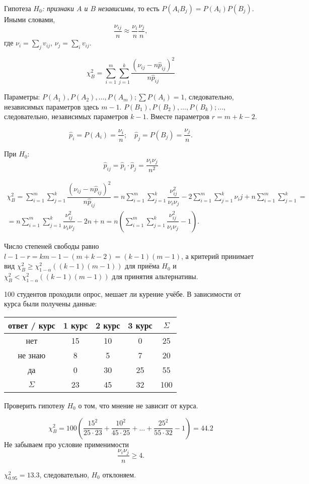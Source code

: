 Гипотеза \emph{$H_0$: признаки $A$ и $B$ независимы}, то есть
$P(A_i B_j) = P(A_i) P(B_j)$.
Иными словами,
\[
  \dfrac{\nu_{ij}}{n} \approx \dfrac{\nu_i}{n} \dfrac{\nu_j}{n},
\]
где $\nu_i = \sum_j v_{ij}$, $\nu_j = \sum_i v_{ij}$.

\[
  \chi^2_B = \sum_{i=1}^m \sum_{j=1}^k \dfrac{(\nu_{ij} - n \hat p_{ij})^2}{n \hat p_{ij}}
\]

Параметры: $P(A_1), P(A_2), \dots, P(A_m); \sum P(A_i) = 1$, следовательно, независимых параметров здесь $m-1$. $P(B_1), P(B_2), \dots, P(B_k); \dots$, следовательно, независимых параметров $k-1$. Вместе параметров $r = m+k-2$.

\[
  \hat p_{i} = P(A_i) = \frac{\nu_i}{n}; \quad \hat p_j = P(B_j) = \frac{\nu_j}{n}.
\]

При $H_0$:
\[
  \hat p_{ij} = \hat p_i \cdot \hat p_j = \dfrac{\nu_i \nu_j}{n^2}
\]

\begin{multline*}
  \chi^2_B
  = \sum_{i=1}^m \sum_{j=1}^k \dfrac{(\nu_{ij} - n \hat p_{ij})^2}{n \hat p_{ij}}
  = n \sum_{i=1}^m \sum_{j=1}^k \dfrac{\nu^2_{ij}}{\nu_i \nu_j} - 2 \sum_{i=1}^m \sum_{j=1}^k \nu_ij + n \sum_{i=1}^m \sum_{j=1}^k = \\
  = n \sum_{i=1}^m \sum_{j=1}^k \dfrac{\nu^2_{ij}}{\nu_i \nu_j} - 2n + n
  = n \left(\sum_{i=1}^m \sum_{j=1}^k \dfrac{\nu^2_{ij}}{\nu_i \nu_j} -
  1\right).
\end{multline*}

Число степеней свободы равно
$l-1-r = k m - 1 - (m+k-2) = (k-1)(m-1)$,
а критерий принимает вид $\chi^2_B \geqslant \chi^2_{1-\alpha} ( (k-1)(m-1) )$
для приёма $H_0$ и
$\chi^2_B < \chi^2_{1-\alpha} ( (k-1)(m-1) )$ для принятия альтернативы.

\begin{ex}
  100 студентов проходили опрос, мешает ли курение учёбе.
  В зависимости от курса были получены данные:

  \begin{center}
    \begin{tabular}{|c|c|c|c|c|}
      \hline
      ответ / курс & 1 курс & 2 курс & 3 курс & $ \Sigma $ \\
      \hline
      нет & 15 & 10 & 0 & 25\\
      \hline
      не знаю & 8 & 5 & 7 & 20 \\
      \hline
      да & 0 & 30 & 25 & 55 \\
      \hline
      $ \Sigma $  & 23 & 45 & 32 & 100 \\
      \hline
    \end{tabular}
  \end{center}

  Проверить гипотезу $H_0$ о том, что мнение не зависит от курса.
  \begin{solution}
  \[
  \chi^2_B = 100 \left(\dfrac{15^2}{25\cdot23} + \dfrac{10^2}{45\cdot25} + \dots
  + \dfrac{25^2}{55\cdot32} - 1\right) = 44.2
  \]
  Не забываем про условие применимости
  \[
    \dfrac{\nu_i \nu_j}{n} \geqslant 4.
  \]

  $\chi^2_{0.95} = 13.3$, следовательно, $H_0$ отклоняем.
\end{solution}
\end{ex}


